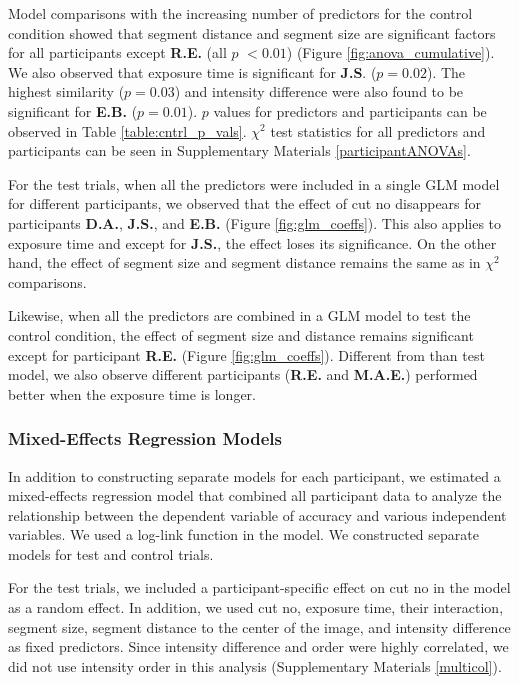 \documentclass{article}
\begin{document}
Model comparisons with the increasing number of predictors for the control condition showed that segment distance and segment size are significant factors for all participants except \textbf{R.E.} (all $p$ $< 0.01$) (Figure \ref{fig:anova_cumulative}). We also observed that exposure time is significant for \textbf{J.S}. ($p = 0.02$). The highest similarity ($p = 0.03$) and intensity difference were also found to be significant for \textbf{E.B.} ($p = 0.01$). $p$ values for predictors and participants can be observed in Table \ref{table:cntrl_p_vals}. $\chi^{2}$ test statistics for all predictors and participants can be seen in Supplementary Materials \ref{participantANOVAs}.


For the test trials, when all the predictors were included in a single GLM model for different participants, we observed that the effect of cut no disappears for participants \textbf{D.A.}, \textbf{J.S.}, and \textbf{E.B.} (Figure \ref{fig:glm_coeffs}). This also applies to exposure time and except for \textbf{J.S.}, the effect loses its significance. On the other hand, the effect of segment size and segment distance remains the same as in $\chi^2$ comparisons.

Likewise, when all the predictors are combined in a GLM model to test the control condition, the effect of segment size and distance remains significant except for participant \textbf{R.E.} (Figure \ref{fig:glm_coeffs}). Different from than test model, we also observe different participants (\textbf{R.E.} and \textbf{M.A.E.}) performed better when the exposure time is longer. 

\subsubsection{Mixed-Effects Regression Models}
In addition to constructing separate models for each participant, we estimated a mixed-effects regression model that combined all participant data to analyze the relationship between the dependent variable of accuracy and various independent variables. We used a log-link function in the model. We constructed separate models for test and control trials.

For the test trials, we included a participant-specific effect on cut no in the model as a random effect. In addition, we used cut no, exposure time, their interaction, segment size, segment distance to the center of the image, and intensity difference as fixed predictors. Since intensity difference and order were highly correlated, we did not use intensity order in this analysis (Supplementary Materials \ref{multicol}).
\end{document}

